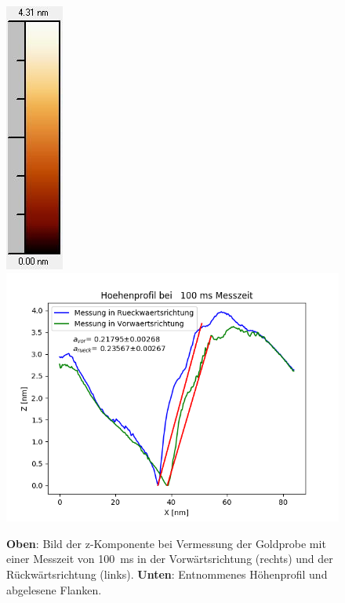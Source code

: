 \documentclass[12pt,a4paper]{article}
\begin{document}
\begin{figure}
\includegraphics[scale=0.6]{Bilder/Anhang/Zeit/0_1_Zeit_nach_Skala.jpg}
\includegraphics[scale=0.6]{Bilder/Anhang/Zeit/Profil_Zeit_100.png}
\caption{\textbf{Oben}: Bild der z-Komponente bei Vermessung der Goldprobe mit einer Messzeit von \SI{100}{ms} in der Vorwärtsrichtung (rechts) und der Rückwärtsrichtung (links). \textbf{Unten}: Entnommenes Höhenprofil und abgelesene Flanken.}
\end{figure}
\end{document}
